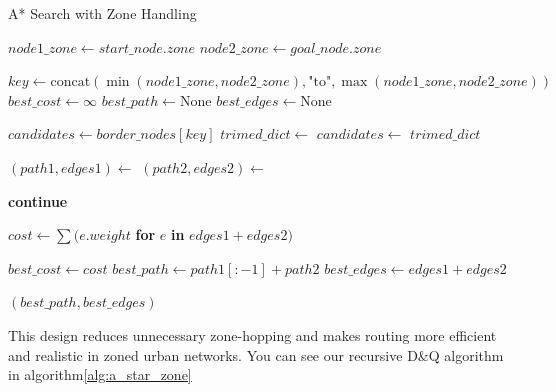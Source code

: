 \documentclass[12pt]{article}
\begin{document}
\begin{algorithm}
    \caption{A* Search with Zone Handling}
    \label{alg:a_star_zone}
    \begin{algorithmic}[1]
        \State $node1\_zone \gets start\_node.zone$
        \State $node2\_zone \gets goal\_node.zone$
        
            \State \Return {}
        \EndIf
        
        \State $key \gets \text{concat}(\min(node1\_zone, node2\_zone), \text{"to"}, \max(node1\_zone, node2\_zone))$
        \State $best\_cost \gets \infty$
        \State $best\_path \gets \text{None}$
        \State $best\_edges \gets \text{None}$
        
            \State $candidates \gets border\_nodes[key]$
        \Else
            \State $trimed\_dict \gets$ 
            \State $candidates \gets$  $trimed\_dict$ 
        \EndIf
        
            \State $(path1, edges1) \gets$ 
            \State $(path2, edges2) \gets$ 
            
                \State \textbf{continue}
            \EndIf
            
            \State $cost \gets \sum(e.weight$ \textbf{for} $e$ \textbf{in} $edges1 + edges2)$
            
                \State $best\_cost \gets cost$
                \State $best\_path \gets path1[:-1] + path2$
                \State $best\_edges \gets edges1 + edges2$
            \EndIf
        \EndFor
        
        \State \Return $(best\_path, best\_edges)$
    \EndProcedure
    \end{algorithmic}
    \end{algorithm}

This design reduces unnecessary zone-hopping and makes routing more efficient and realistic in zoned urban networks. You can see our recursive D\&Q algorithm in algorithm\ref{alg:a_star_zone}
\end{document}
